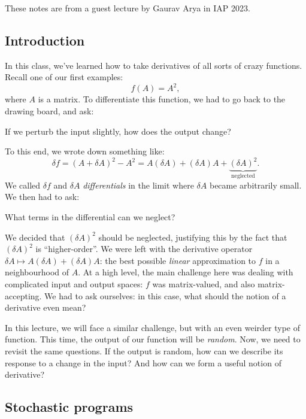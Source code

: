 These notes are from a guest lecture by Gaurav Arya in IAP 2023.

\subsection{Introduction}

In this class, we've learned how to take derivatives of all sorts of crazy functions.
Recall one of our first examples:
\begin{equation}
    f(A) = A^2,
\end{equation}
where $A$ is a matrix.
To differentiate this function, we had to go back to the drawing board, and
ask: 
\begin{question}
If we perturb the input slightly, how does the output change?
\label{question:perturb}
\end{question}
To this end, we wrote down something like:
\begin{equation}
    \delta f = (A+\delta A)^2 - A^2 = A (\delta A) + (\delta A) A + \underbrace{(\delta A)^2}_{\text{neglected}}.
\end{equation}
We called $\delta f$ and $\delta A$ \emph{differentials} in the limit where $\delta A$ became arbitrarily small. 
We then had to ask: 
\begin{question}
What terms in the differential can we neglect?
\label{question:neglect}
\end{question}
We decided that $(\delta A)^2$ should be neglected, 
justifying this by the fact
that $(\delta A)^2$ is ``higher-order''. We were left with the derivative operator $\delta A \mapsto 
A(\delta A) + (\delta A) A$: the best possible \emph{linear} approximation
to $f$ in a neighbourhood of $A$. At a high level, the main challenge here was dealing with
complicated input and output spaces: $f$ was matrix-valued, and also matrix-accepting. 
We had to ask ourselves: in this case, what should the notion of a derivative even mean?

In this lecture, we will face a similar challenge, but with an even weirder type of function.
This time, the output of our function will be \emph{random}. Now, we need to 
revisit the same questions. If the output is random,
how can we describe its response to a change in the input?
And how can we form a useful notion of derivative?

\subsection{Stochastic programs}

